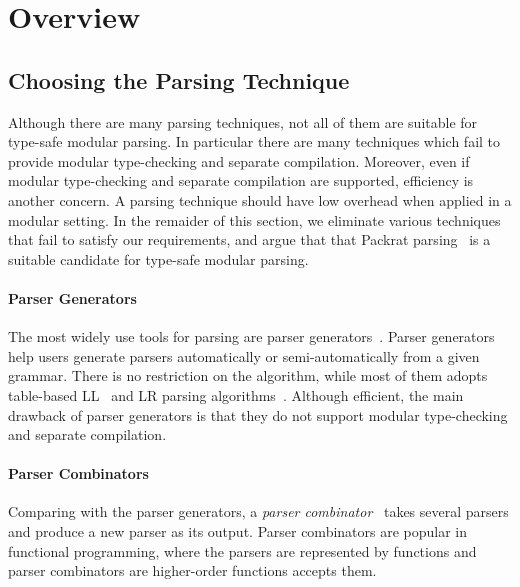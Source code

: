 \section{Overview}\label{sec:overview}

\subsection{Choosing the Parsing Technique}\label{subsec:overview-parsing}


Although there are many parsing techniques, not all of them are
suitable for type-safe modular parsing. In particular there are many
techniques which fail to provide modular type-checking and separate
compilation. Moreover, even if modular type-checking and separate
compilation are supported, efficiency is another
concern. A parsing technique should have low overhead when applied
in a modular setting. In the remaider of this section, we eliminate
various techniques that fail to satisfy our requirements, and argue
that that Packrat parsing~\cite{} is a suitable candidate for
type-safe modular parsing.

\paragraph{Parser Generators} The most widely use tools for parsing
are parser generators~\cite{}. Parser generators help users generate parsers automatically or
semi-automatically from a given grammar. There is no restriction on
the algorithm, while most of them adopts table-based LL~\cite{} and LR parsing
algorithms~\cite{}.
Although efficient, the main drawback of parser generators is that they do not support
modular type-checking and separate compilation.


\paragraph{Parser Combinators}
Comparing with the parser generators, a \textit{parser combinator}~\cite{}
takes several parsers and produce a new parser as its output. Parser combinators are
popular in functional programming, where the parsers are represented
by functions and parser combinators are higher-order functions accepts
them.

